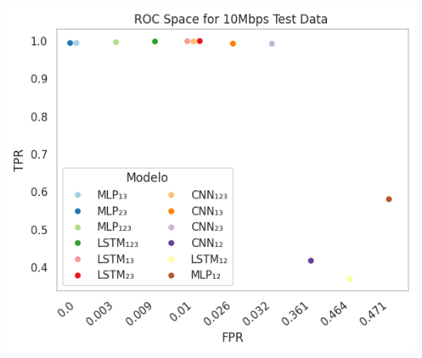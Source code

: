 \begin{minipage}{0.1\textwidth}
	\centering
	\includegraphics[width=1.0\textwidth]{./figs/ROC-Space-Test-Data-10Mbps.png}
	\label{fig:ROCDesempenhoteste10Mbps}	
\end{minipage}
\hfill
\endgroup














\begingroup
\setlength{\tabcolsep}{0.5pt} %

